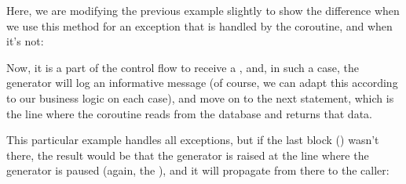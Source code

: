 \documentclass[a4paper,10pt,english]{sphinxmanual}
\begin{document}
Here, we are modifying the previous example slightly to show the difference when we use
this method for an exception that is handled by the coroutine, and when it’s not:

\begin{sphinxVerbatim}[commandchars=\\\{\}]
 

 
     
             
           
           
\end{sphinxVerbatim}

Now, it is a part of the control flow to receive a , and, in such a case, the
generator will log an informative message (of course, we can adapt this according to our
business logic on each case), and move on to the next  statement, which is the line
where the coroutine reads from the database and returns that data.

This particular example handles all exceptions, but if the last block ()
wasn’t there, the result would be that the generator is raised at the line where the generator
is paused (again, the ), and it will propagate from there to the caller:
\end{document}
